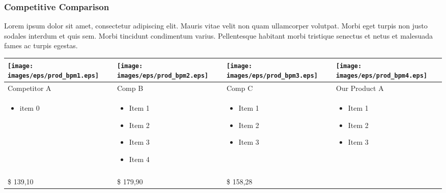 \documentclass[11pt]{article}
\begin{document}
\subsubsection{Competitive Comparison}
Lorem ipsum dolor sit amet, consectetur adipiscing elit. Mauris vitae velit 
non quam ullamcorper volutpat. Morbi eget turpis non justo sodales interdum 
et quis sem. Morbi tincidunt condimentum varius. Pellentesque habitant morbi 
tristique senectus et netus et malesuada fames ac turpis egestas.\newline
\begin{tabular}{| m{92 pt} | m{92 pt} | m{92 pt} | m{92 pt} |}\hline
	\texttt{[image: images/eps/prod\_bpm1.eps]} & 
		\texttt{[image: images/eps/prod\_bpm2.eps]} & 
		\texttt{[image: images/eps/prod\_bpm3.eps]} & 
		\texttt{[image: images/eps/prod\_bpm4.eps]} \\ \hline
	Competitor A & Comp B & Comp C & Our Product A\\ \hline
	\begin{itemize} \tiny \item  item 0 \end{itemize} & 
					\begin{itemize} \tiny 
							\item Item 1
							\item Item 2
							\item Item 3
							\item Item 4\end{itemize} & 
					\begin{itemize} \tiny 
							\item Item 1
							\item Item 2
							\item Item 3\end{itemize}& 
					\begin{itemize} \tiny 
							\item Item 1
							\item Item 2
							\item Item 3 \end{itemize} \\
	& & & \\ \hline
	\$ 139,10 & \$ 179,90 & \$ 158,28 & \\ \hline
\end{tabular}
\end{document}
